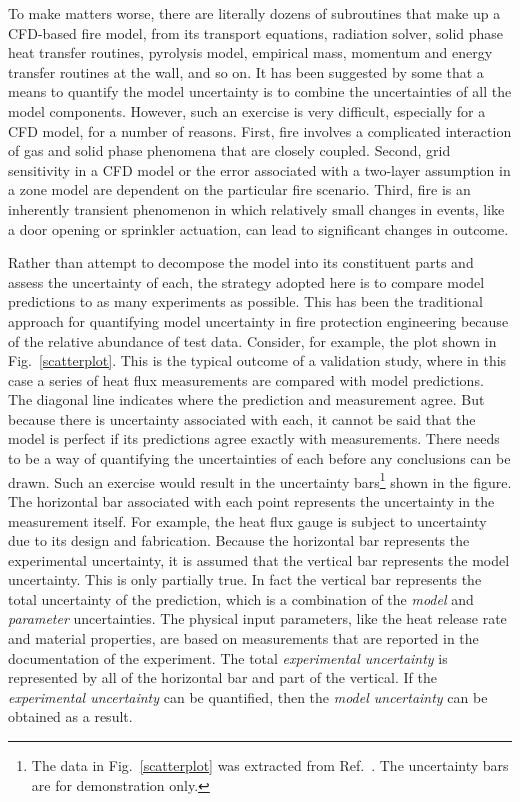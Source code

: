 To make matters worse, there are literally dozens of subroutines that make up a CFD-based fire model, from its transport equations, radiation solver, solid phase heat transfer routines, pyrolysis model, empirical mass, momentum and energy transfer routines at the wall, and so on.  It has been suggested by some that a means to quantify the model uncertainty is to combine the uncertainties of all the model components.  However, such an exercise is very difficult, especially for a CFD model, for a number of reasons. First, fire involves a complicated interaction of gas and solid phase phenomena that are closely coupled.  Second, grid sensitivity in a CFD model or the error associated with a two-layer assumption in a zone model are dependent on the particular fire scenario.  Third, fire is an inherently transient phenomenon in which relatively small changes in events, like a door opening or sprinkler actuation, can lead to significant changes in outcome.

Rather than attempt to decompose the model into its constituent parts and assess the uncertainty of each, the strategy adopted here is to compare model predictions to as many experiments as possible. This has been the traditional approach for quantifying model uncertainty in fire protection engineering because of the relative abundance of test data. Consider, for example, the plot shown in Fig.~\ref{scatterplot}. This is the typical outcome of a validation study, where in this case a series of heat flux measurements are compared with model predictions.  The diagonal line indicates where the prediction and measurement agree.  But because there is uncertainty associated with each, it cannot be said that the model is perfect if its predictions agree exactly with measurements.  There needs to be a way of quantifying the uncertainties of each before any conclusions can be drawn.  Such an exercise would result in the uncertainty bars\footnote{The data in Fig.~\ref{scatterplot} was extracted from Ref.~\cite{NUREG_1824_Sup_1}.  The uncertainty bars are for demonstration only.} shown in the figure. The horizontal bar associated with each point represents the uncertainty in the measurement itself.  For example, the heat flux gauge is subject to uncertainty due to its design and fabrication.  Because the horizontal bar represents the experimental uncertainty, it is assumed that the vertical bar represents the model uncertainty. This is only partially true. In fact the vertical bar represents the total uncertainty of the prediction, which is a combination of the {\em model} and {\em parameter} uncertainties. The physical input parameters, like the heat release rate and material properties, are based on measurements that are reported in the documentation of the experiment.  The total {\em experimental uncertainty} is represented by all of the horizontal bar and part of the vertical. If the {\em experimental uncertainty} can be quantified, then the {\em model uncertainty} can be obtained as a result.

